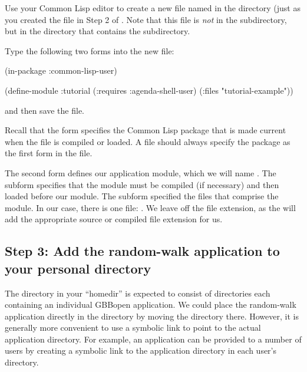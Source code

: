 \documentclass[10pt,twoside,english,pdftex]{article}
\begin{document}
Use your Common Lisp editor to create a new file named
 in the  directory (just as you
created the  file in Step 2 of
.  Note that this file is
\textit{not\/} in the  subdirectory, but in the 
directory that contains the  subdirectory.

Type the following two forms into the new 
file:
%
\W\supp
\begin{example}
  (in-package :common-lisp-user)

  (define-module :tutorial
    (:requires :agenda-shell-user)
    (:files "tutorial-example"))
\end{example}
%
and then save the file.

Recall that the  form specifies the Common Lisp
package that is made current when the file is compiled or loaded.  A
 file should always specify the
 package as the first form in the file.

The second form defines our application module, which we will name
.  The  subform specifies that the
 module must be compiled (if necessary) and
then loaded before our  module.  The  subform
specified the files that comprise the module. In our case, there is one file:
.  We leave off the  file
extension, as the  will add the
appropriate source or compiled file extension for us.

\subsection*{Step 3: Add the random-walk application to your personal
   directory}

The  directory in your ``homedir'' is expected to
consist of directories each containing an individual GBBopen application.  We
could place the random-walk application directly in the
 directory by moving the 
directory there.  However, it is generally more convenient to use a symbolic
link to point to the actual application directory.  For example, an
application can be provided to a number of users by creating a symbolic link
to the application directory in each user's 
directory.
\end{document}
